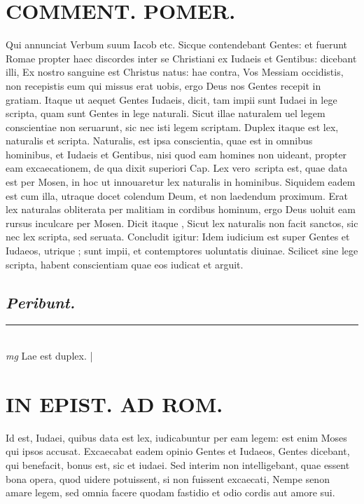 \documentclass{article}
\begin{document}
\begin{pages}
\section*{COMMENT. POMER.  }\pstart Qui annunciat Verbum suum Iacob etc. Sicque contendebant Gentes: et fuerunt Romae propter haec discordes inter se Christiani ex Iudaeis et Gentibus: dicebant illi, Ex nostro sanguine est Christus natus: hae contra, Vos Messiam occidistis, non recepistis eum qui missus erat uobis, ergo Deus nos Gentes recepit in gratiam. Itaque ut aequet Gentes Iudaeis, dicit, tam impii sunt Iudaei in lege scripta, quam sunt Gentes in lege naturali. Sicut illae naturalem uel legem conscientiae non seruarunt, sic nec isti legem scriptam. Duplex itaque est lex, naturalis et scripta. Naturalis, est ipsa conscientia, quae est in omnibus hominibus, et Iudaeis et Gentibus, nisi quod eam homines non uideant, propter eam excaecationem, de qua dixit superiori Cap.  Lex vero scripta est, quae data est per Mosen, in hoc ut innouaretur lex naturalis in hominibus. Siquidem eadem est cum illa, utraque docet colendum Deum, et non laedendum proximum. Erat lex naturalas obliterata per malitiam in cordibus hominum, ergo Deus uoluit eam rursus inculcare per Mosen. Dicit itaque , Sicut lex naturalis non facit sanctos, sic nec lex scripta, sed seruata. Concludit igitur: Idem iudicium est super Gentes et Iudaeos, utrique ; sunt impii, et contemptores uoluntatis diuinae.   \pend\pstart Scilicet sine lege scripta, habent conscientiam quae eos iudicat et arguit.   \pend
{}
{}
\subsection*{\textit{Peribunt. }}
\vspace{0.5cm}\noindent
\vspace{0.2cm}\rule{1cm}{0.2pt}\\ 
\hspace{0.2cm}\textit{mg}
\footnotesize Lae est duplex.  
\normalsize| 
\section*{IN EPIST. AD ROM.  }
\marginpar{[ p.19 ]}\pstart Id est, Iudaei, quibus data est lex, iudicabuntur per eam legem: est enim Moses qui ipsos accusat.  Excaecabat eadem opinio Gentes et Iudaeos, Gentes dicebant, qui benefacit, bonus est, sic et iudaei. Sed interim non intelligebant, quae essent bona opera, quod uidere potuissent, si non fuissent excaecati, Nempe senon amare legem, sed omnia facere quodam fastidio et odio cordis aut amore sui.   \pend
{}
{}

\end{pages}
\end{document}
